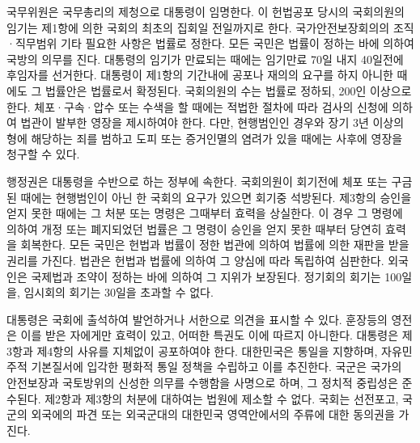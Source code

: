 \documentclass[doctor, korean]{pnuthesis}
\begin{document}
국무위원은 국무총리의 제청으로 대통령이 임명한다. 이 헌법공포 당시의 국회의원의 임기는 제1항에 의한 국회의 최초의 집회일 전일까지로 한다. 국가안전보장회의의 조직·직무범위 기타 필요한 사항은 법률로 정한다. 모든 국민은 법률이 정하는 바에 의하여 국방의 의무를 진다. 대통령의 임기가 만료되는 때에는 임기만료 70일 내지 40일전에 후임자를 선거한다. 대통령이 제1항의 기간내에 공포나 재의의 요구를 하지 아니한 때에도 그 법률안은 법률로서 확정된다. 국회의원의 수는 법률로 정하되, 200인 이상으로 한다. 체포·구속·압수 또는 수색을 할 때에는 적법한 절차에 따라 검사의 신청에 의하여 법관이 발부한 영장을 제시하여야 한다. 다만, 현행범인인 경우와 장기 3년 이상의 형에 해당하는 죄를 범하고 도피 또는 증거인멸의 염려가 있을 때에는 사후에 영장을 청구할 수 있다.

행정권은 대통령을 수반으로 하는 정부에 속한다. 국회의원이 회기전에 체포 또는 구금된 때에는 현행범인이 아닌 한 국회의 요구가 있으면 회기중 석방된다. 제3항의 승인을 얻지 못한 때에는 그 처분 또는 명령은 그때부터 효력을 상실한다. 이 경우 그 명령에 의하여 개정 또는 폐지되었던 법률은 그 명령이 승인을 얻지 못한 때부터 당연히 효력을 회복한다. 모든 국민은 헌법과 법률이 정한 법관에 의하여 법률에 의한 재판을 받을 권리를 가진다. 법관은 헌법과 법률에 의하여 그 양심에 따라 독립하여 심판한다. 외국인은 국제법과 조약이 정하는 바에 의하여 그 지위가 보장된다. 정기회의 회기는 100일을, 임시회의 회기는 30일을 초과할 수 없다.

대통령은 국회에 출석하여 발언하거나 서한으로 의견을 표시할 수 있다. 훈장등의 영전은 이를 받은 자에게만 효력이 있고, 어떠한 특권도 이에 따르지 아니한다. 대통령은 제3항과 제4항의 사유를 지체없이 공포하여야 한다. 대한민국은 통일을 지향하며, 자유민주적 기본질서에 입각한 평화적 통일 정책을 수립하고 이를 추진한다. 국군은 국가의 안전보장과 국토방위의 신성한 의무를 수행함을 사명으로 하며, 그 정치적 중립성은 준수된다. 제2항과 제3항의 처분에 대하여는 법원에 제소할 수 없다. 국회는 선전포고, 국군의 외국에의 파견 또는 외국군대의 대한민국 영역안에서의 주류에 대한 동의권을 가진다.
\end{document}
